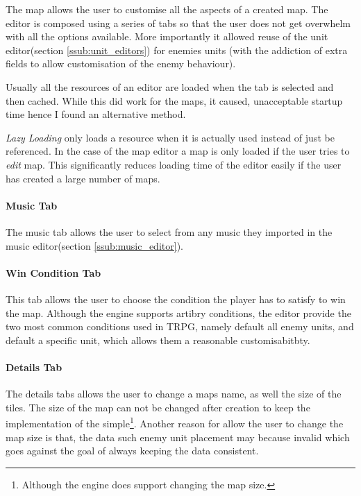 The map allows the user to customise all the aspects of a created map.  The editor is composed using a series of tabs so that the user does not get overwhelm with all the options available. More importantly it allowed reuse of the unit editor(section \ref{ssub:unit_editors}) for enemies units (with the addiction of extra fields to allow customisation of the enemy behaviour).

Usually all the resources of an editor are loaded when the tab is selected and then cached.  While this did work for the maps, it caused, unacceptable startup time hence I found an alternative method. 

\emph{Lazy Loading} only loads a resource when it is actually used instead of just be referenced. In the case of the map editor a map is only loaded if the user tries to \emph{edit} map. This significantly reduces loading time of the editor easily if the user has created a large number of maps.


\paragraph{Music Tab\\}
The music tab allows the user to select from any music they imported in the music editor(section \ref{ssub:music_editor}).

\paragraph{Win Condition Tab}
This tab allows the user to choose the condition the player has to satisfy to win the map. Although the engine supports artibry conditions, the editor provide the two most common conditions used in TRPG, namely default all enemy units, and default a specific unit, which allows them a reasonable customisabitbty. 

\paragraph{Details Tab\\}
The details tabs allows the user to change a maps name, as well the size of the tiles.  The size of the map can not be changed after creation to keep the implementation of the simple\footnote{Although the engine does support changing the map size.}. Another reason for allow the user to change the map size is that, the data such enemy unit placement may because invalid which goes against the goal of always keeping the data consistent.  

